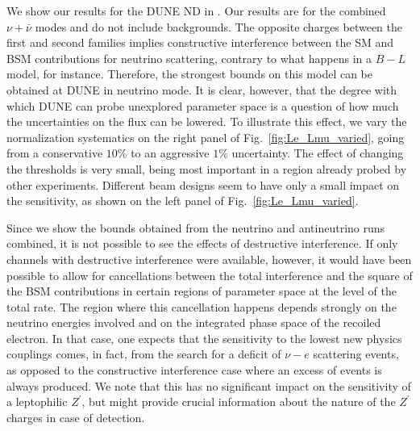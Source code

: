 We show our results for the DUNE ND in . Our results are for the combined $\nu+\bar\nu$ modes and do not include backgrounds. The opposite charges between the first and second families implies constructive interference between the SM and BSM contributions for neutrino scattering, contrary to what happens in a $B-L$ model, for instance. Therefore, the strongest bounds on this model can be obtained at DUNE in neutrino mode. It is clear, however, that the degree with which DUNE can probe unexplored parameter space is a question of how much the uncertainties on the flux can be lowered. To illustrate this effect, we vary the normalization systematics on the right panel of Fig.~\ref{fig:Le_Lmu_varied}, going from a conservative $10\%$ to an aggressive $1\%$ uncertainty. The effect of changing the thresholds is very small, being most important in a region already probed by other experiments. Different beam designs seem to have only a small impact 
on the sensitivity, as shown on the left panel of Fig.~\ref{fig:Le_Lmu_varied}.

Since we show the bounds obtained from the neutrino and antineutrino runs combined, it is not possible to see the effects of destructive interference. If only channels with destructive interference were available, however, it would have been possible to allow for cancellations between the total interference and the square of the BSM contributions in certain regions of parameter space at the level of the total rate. The region where this cancellation happens depends strongly on the neutrino energies involved and on the integrated phase space of the recoiled electron. In that case, one expects that the sensitivity to the lowest new physics couplings comes, in fact, from the search for a deficit of $\nu-e$ scattering events, as opposed to the constructive interference case where an excess of events is always produced. We note that this has no significant impact on the sensitivity of a leptophilic $Z^\prime$, but might provide crucial information about the nature of the $Z^\prime$ charges in case of detection. 

